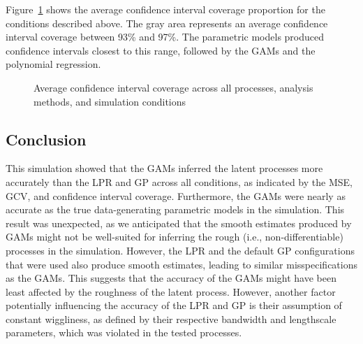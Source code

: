 \documentclass[man, floatsintext]{apa7}
\begin{document}
Figure~\ref{fig:mean_results_ci_coverage} shows the average confidence interval
coverage proportion for the conditions described above. The gray area
represents an average confidence interval coverage between 93\% and 97\%. The
parametric models produced confidence intervals closest to this range, followed
by the GAMs and the polynomial regression.

\begin{figure}[!t]
  \caption{Average confidence interval coverage across all processes, analysis
    methods, and simulation conditions}
  \label{fig:mean_results_ci_coverage}
\end{figure}

\subsection{Conclusion}

This simulation showed that the GAMs inferred the latent processes more
accurately than the LPR and GP across all conditions, as indicated by the MSE,
GCV, and confidence interval coverage. Furthermore, the GAMs were nearly as
accurate as the true data-generating parametric models in the simulation. This
result was unexpected, as we anticipated that the smooth estimates produced by
GAMs might not be well-suited for inferring the rough (i.e.,
non-differentiable) processes in the simulation. However, the LPR and the
default GP configurations that were used also produce smooth estimates, leading
to similar misspecifications as the GAMs. This suggests that the accuracy of
the GAMs might have been least affected by the roughness of the latent process.
However, another factor potentially influencing the accuracy of the LPR and GP
is their assumption of constant wiggliness, as defined by their respective
bandwidth and lengthscale parameters, which was violated in the tested
processes.
\end{document}
